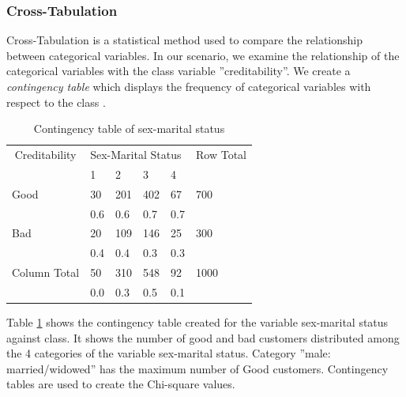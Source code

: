 \documentclass[sigconf]{acmart}
\begin{document}
\subsubsection{Cross-Tabulation}

Cross-Tabulation is a statistical method used to compare the relationship between categorical variables. In our scenario, we examine the relationship of the categorical variables with the class variable ''creditability''. We create a \emph{contingency table} which displays the frequency of categorical variables with respect to the class \cite{cross-tabulation}. 


\begin{table}[]
\centering
\caption{Contingency table of sex-marital status
\cite{psu-site}}
\label{tab:table3}
\begin{tabular}{|l|l|l|l|l|l|}
\hline
\multicolumn{1}{|c|}{\multirow{}{}{Creditability}} & \multicolumn{4}{l|}{Sex-Marital Status} & \multirow{}{}{Row Total} \\ \cline{2-5}
\multicolumn{1}{|c|}{}                               & 1        & 2        & 3       & 4       &                            \\ \hline
\multirow{}{}{Good}                                & 30       & 201      & 402     & 67      & \multirow{}{}{700}       \\ \cline{2-5}
                                                     & 0.6      & 0.6      & 0.7     & 0.7     &                            \\ \hline
\multirow{}{}{Bad}                                 & 20       & 109      & 146     & 25      & \multirow{}{}{300}       \\ \cline{2-5}
                                                     & 0.4      & 0.4      & 0.3     & 0.3     &                            \\ \hline
\multirow{}{}{Column Total}                        & 50       & 310      & 548     & 92      & \multirow{}{}{1000}      \\ \cline{2-5}
                                                     & 0.0      & 0.3      & 0.5     & 0.1     &                            \\ \hline
\end{tabular}
\end{table}


Table \ref{tab:table3} shows the contingency table created for the variable sex-marital status against class. It shows the number of good and bad customers distributed among the 4 categories of the variable sex-marital status. Category ''male: married/widowed'' has the maximum number of Good customers. Contingency tables are used to create the Chi-square values.
\end{document}
